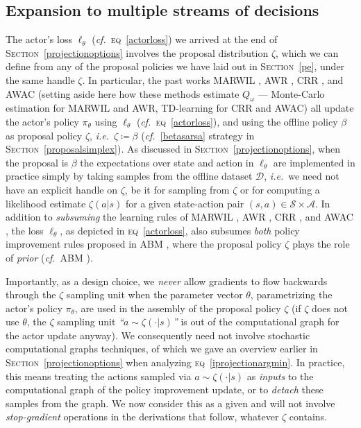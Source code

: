 \subsection{Expansion to multiple streams of decisions}
\label{multisteams}
The actor's loss $\ell_\theta$ (\textit{cf.}~\textsc{eq}~\ref{actorloss})
we arrived at the end of \textsc{Section}~\ref{projectionoptions}
involves the proposal distribution $\zeta$,
which we can define from any of the proposal policies we have laid out in \textsc{Section}~\ref{pe}, under
the same handle $\zeta$.
In particular, the past works
MARWIL \cite{Wang2018-dn},
AWR \cite{Peng2019-hu},
CRR \cite{Wang2020-sr},
and AWAC \cite{Nair2020-gd}
(setting aside here how these methods estimate $Q_\omega$ --- Monte-Carlo estimation for MARWIL and AWR,
TD-learning for CRR and AWAC)
all update the actor's policy $\pi_\theta$ using $\ell_\theta$ (\textit{cf.}~\textsc{eq}~\ref{actorloss}),
and using the offline policy $\beta$ as proposal policy $\zeta$, \textit{i.e.}~$\zeta \coloneqq \beta$
(\textit{cf.}~\ref{betasarsa} strategy in \textsc{Section}~\ref{proposalsimplex}).
As discussed in \textsc{Section}~\ref{projectionoptions}, when the proposal is $\beta$ the expectations
over state and action in $\ell_\theta$ are implemented in practice simply by taking samples from the offline
dataset $\mathcal{D}$, \textit{i.e.}~we need not have an explicit handle on $\zeta$, be it for sampling from $\zeta$
or for computing a likelihood estimate $\zeta(a | s)$ for a given state-action pair
$(s,a) \in \mathcal{S} \times \mathcal{A}$.
In addition to \emph{subsuming} the learning rules of
MARWIL \cite{Wang2018-dn},
AWR \cite{Peng2019-hu},
CRR \cite{Wang2020-sr},
and AWAC \cite{Nair2020-gd},
the loss $\ell_\theta$, as depicted in \textsc{eq}~\ref{actorloss},
also subsumes \emph{both} policy improvement rules proposed in
ABM \cite{Siegel2020-lo},
where the proposal policy $\zeta$ plays the role of \emph{prior} (\textit{cf.}~ABM \cite{Siegel2020-lo}).

Importantly, as a design choice, we \emph{never} allow gradients to flow backwards through the $\zeta$ sampling unit
when the parameter vector $\theta$, parametrizing the actor's policy $\pi_\theta$, are used in the assembly of
the proposal policy $\zeta$ (if $\zeta$ does not use $\theta$, the $\zeta$ sampling unit
\textit{``$a \sim \zeta(\cdot | s)$''} is out of the computational graph for the actor update anyway).
We consequently need not involve stochastic computational graphs techniques, of which we gave an overview
earlier in \textsc{Section}~\ref{projectionoptions} when analyzing \textsc{eq}~\ref{iprojectionargmin}.
In practice, this means treating the actions sampled via $a \sim \zeta(\cdot | s)$ as \textit{inputs}
to the computational graph of the policy improvement update, or to \textit{detach} these samples from the graph.
We now consider this as a given and
will not involve \textit{stop-gradient} operations in the derivations that follow, whatever $\zeta$ contains.


